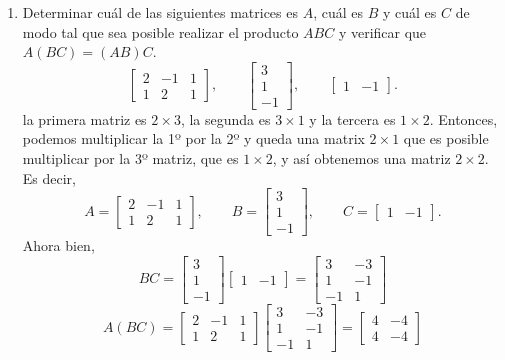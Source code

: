 \begin{enumerate}[topsep=6pt,itemsep=.4cm]
\item\label{ej2} Determinar cuál de las siguientes matrices es $A$, cuál es $B$ y cuál es $C$ de modo tal que sea posible realizar el producto $ABC$ y verificar que $A(BC)=(AB)C$.
\begin{equation*}
\begin{bmatrix} 2 & -1 & 1 \\ 1 & 2 &
1\end{bmatrix},\qquad
\begin{bmatrix} 3 \\ 1 \\ -1\end{bmatrix}, \qquad
\begin{bmatrix} 1 & -1 \end{bmatrix}.
\end{equation*}
\rta la  primera matriz es $2 \times 3$, la segunda es $3 \times 1$ y la tercera es $1 \times 2$. Entonces, podemos multiplicar la 1º por  la 2º y  queda una matrix $2 \times 1$ que es posible multiplicar por la 3º matriz,  que es $1 \times 2$,  y así obtenemos una matriz $2 \times 2$.  Es decir,
\begin{equation*}
    A=\begin{bmatrix} 2 & -1 & 1 \\ 1 & 2 &
    1\end{bmatrix},\qquad
    B= \begin{bmatrix} 3 \\ 1 \\ -1\end{bmatrix}, \qquad
    C= \begin{bmatrix} 1 & -1 \end{bmatrix}.
\end{equation*}
Ahora bien, 
\begin{equation*}
BC= \begin{bmatrix} 3 \\ 1 \\ -1\end{bmatrix}\begin{bmatrix} 1 & -1 \end{bmatrix} =  \begin{bmatrix} 3& -3\\ 1&-1 \\-1 &1\end{bmatrix}
\end{equation*}
\begin{equation*}
    A(BC)=\begin{bmatrix} 2 & -1 & 1 \\ 1 & 2 &    1\end{bmatrix}\begin{bmatrix} 3& -3\\ 1&-1 \\-1 &1\end{bmatrix} =  \begin{bmatrix} 4&-4 \\ 4&-4 \end{bmatrix}

\end{equation*}
\end{enumerate}
